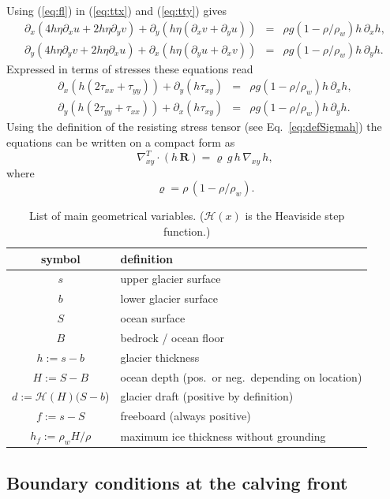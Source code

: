 \documentclass[10pt,a4paper]{book}
\newcommand{\He}{\mathcal{H}}
\newcommand{\p}{\partial}
\newcommand{\txx}{\tau_{xx}}
\newcommand{\tyy}{\tau_{yy}}
\newcommand{\txy}{\tau_{xy}}
\begin{document}
Using (\ref{eq:fl}) in (\ref{eq:ttx}) and (\ref{eq:tty}) gives
\begin{eqnarray} 
\p_x ( 4 h \eta \p_x u + 2 h \eta \p_y v) +\p_y ( h \eta (\p_x v + \p_y u)) 
&=&\rho g (1-\rho/\rho_w) h \, \p_x h  ,\\
\p_y ( 4 h \eta \p_y v + 2 h \eta \p_x u) +\p_x ( h \eta (\p_y u + \p_x v)) 
&=&\rho g (1-\rho/\rho_w) h \, \p_y h  .
\end{eqnarray}
Expressed in terms of stresses these equations read
\begin{eqnarray}
\p_x (h (2\txx+\tyy)) + \p_y (h\txy) &=& \rho g (1-\rho/\rho_w) h \, \p_x h ,\\
\p_y (h (2\tyy+\txx)) + \p_x (h\txy) &=& \rho g (1-\rho/\rho_w) h \, \p_y h  .
\end{eqnarray} 
Using the definition of the resisting stress tensor (see Eq.~\ref{eq:defSigmah})
the equations can be written on a compact form as
\[
\nabla_{xy}^T \cdot (h \, \bm{R})  = \varrho \, g \, h \, \nabla_{xy} \, h ,
\]
where
\[
\varrho=\rho \, (1-\rho/\rho_w)
.\]

\begin{table}
\caption{\label{tab:geo} List of main geometrical variables. ($\He(x)$
  is the Heaviside step function.)}
\begin{center}
\begin{tabular}{cl}
\hline
symbol & definition\\
\hline
$s$ & upper glacier surface \\
$b$ & lower glacier surface \\
$S$ & ocean surface \\
$B$ & bedrock / ocean floor \\
$h:=s-b$ & glacier thickness \\
$H:=S-B$ & ocean depth (pos.\ or neg.\ depending on location) \\
$d:=\He(H) (S-b$) & glacier draft (positive by definition) \\
$f:=s-S$ & freeboard (always positive) \\
$h_f:=\rho_w H /\rho$ & maximum ice thickness without grounding \\
\hline
\end{tabular}
\end{center}
\end{table}

\subsection{Boundary conditions at the calving front}
\end{document}
